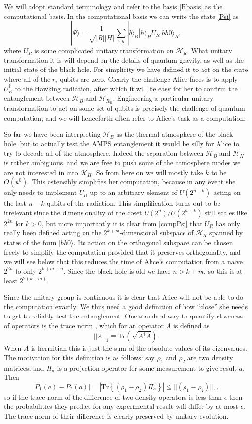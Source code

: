 \documentclass[12pt]{article}
\newcommand{\be}{\begin{equation}}
\newcommand{\ee}{\end{equation}}
\newcommand{\HH}{\mathcal{H}_H}
\newcommand{\HB}{\mathcal{H}_B}
\newcommand{\HR}{\mathcal{H}_R}
\newcommand{\HRB}{\mathcal{H}_{R_B}}
\newcommand{\ran}{\rangle}
\newcommand{\Tr}{\mathrm{Tr}}
\begin{document}
We will adopt standard terminology and refer to the basis \eqref{Rbasis} as the computational basis.  In the computational basis we can write the state \eqref{Psi} as
\be\label{compPsi}
|\Psi\ran=\frac{1}{\sqrt{|B||H|}}\sum_{b,h}|b\ran_B |h\ran_H U_R|bh0\ran_R,
\ee
where $U_R$ is some complicated unitary transformation on $\HR$.  What unitary transformation it is will depend on the details of quantum gravity, as well as the initial state of the black hole.  For simplicity we have defined it to act on the state where all of the $r_i$ qubits are zero.  Clearly the challenge Alice faces is to apply $U_R^{\dagger}$ to the Hawking radiation, after which it will be easy for her to confirm the entanglement between $\HB$ and $\HRB$.  Engineering a particular unitary transformation to act on some set of qubits is precisely the challenge of quantum computation, and we will henceforth often refer to Alice's task as a computation.

So far we have been interpreting $\HB$ as the thermal atmosphere of the black hole, but to actually test the AMPS entanglement it would be silly for Alice to try to decode all of the atmosphere.  Indeed the separation between $\HB$ and $\HH$ is rather ambiguous, and we are free to push some of the atmosphere modes we are not interested in into $\HH$.  So from here on we will mostly take $k$ to be $O(n^0)$.  This ostensibly simplifies her computation, because in any event she only needs to implement $U_R$ up to an arbitrary element of $U(2^{n-k})$ acting on the last $n-k$ qubits of the radiation.  This simplification turns out to be irrelevant since the dimensionality of the coset $U(2^n)/U(2^{n-k})$ still scales like $2^{2n}$ for $k>0$, but more importantly it is clear from \eqref{compPsi} that $U_R$ has only really been defined acting on the $2^{k+m}$-dimensional subspace of $\HR$ spanned by states of the form $|bh0\ran$.  Its action on the orthogonal subspace can be chosen freely to simplify the computation provided that it preserves orthogonality, and we will see below that this reduces the time of Alice's computation from a naive $2^{2n}$ to only $2^{k+m+n}$.  Since the black hole is old we have $n>k+m$, so this is at least $2^{2(k+m)}$.

Since the unitary group is continuous it is clear that Alice will not be able to do the computation exactly.  We thus need a good definition of how ``close'' she needs to get to reliably test the entanglement.  One standard way to quantify closeness of operators is the trace norm \cite{Fuchs:1995mk}, which for an operator $A$ is defined as
\be
||A||_1\equiv \Tr\left(\sqrt{A^\dagger A}\right).
\ee
When $A$ is hermitian this is just the sum of the absolute values of its eigenvalues.  The motivation for this definition is as follows: say $\rho_1$ and $\rho_2$ are two density matrices, and $\Pi_a$ is a projection operator for some measurement to give result $a$.  Then
\be
|P_1(a)-P_2(a)|=|\Tr\left\{(\rho_1-\rho_2)\Pi_a\right\}|\leq||(\rho_1-\rho_2)||_1,
\ee
so if the trace norm of the difference of two density operators is less than $\epsilon$ then the probabilities they predict for any experimental result will differ by at most $\epsilon$.  The trace norm of their difference is clearly preserved by unitary evolution.  
\end{document}
